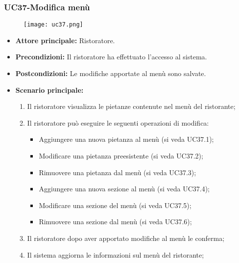 \subsubsection{UC37-Modifica menù}
\begin{figure}[h] \texttt{[image: uc37.png]} \end{figure}
\begin{itemize}
    \item \textbf{Attore principale:} Ristoratore.
    \item \textbf{Precondizioni:} Il ristoratore ha effettuato l'accesso al sistema.
    \item \textbf{Postcondizioni:} Le modifiche apportate al menù sono salvate.
    \item \textbf{Scenario principale:}
    \begin{enumerate}
        \item Il ristoratore visualizza le pietanze contenute nel menù del ristorante;
        \item Il ristoratore può eseguire le seguenti operazioni di modifica:
        \begin{itemize}
           \item Aggiungere una nuova pietanza al menù (si veda UC37.1);
           \item Modificare una pietanza preesistente (si veda UC37.2);
           \item Rimuovere una pietanza dal menù (si veda UC37.3);
           \item Aggiungere una nuova sezione al menù (si veda UC37.4);
           \item Modificare una sezione del menù (si veda UC37.5);
           \item Rimuovere una sezione dal menù (si veda UC37.6);
        \end{itemize}
        \item Il ristoratore dopo aver apportato modifiche al menù le conferma;
        \item Il sistema aggiorna le informazioni sul menù del ristorante;
    \end{enumerate}
\end{itemize}

